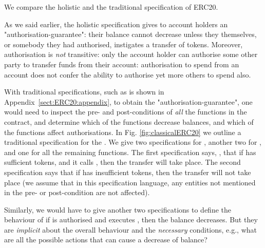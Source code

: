 We compare the holistic and the traditional specification of ERC20.

As we said earlier,  the holistic specification gives to account holders an
 "authorisation-guarantee": their balance cannot decrease unless they
 themselves, or somebody they had authorised, instigates a transfer of
 tokens. Moreover, authorisation is {\em not} transitive: only the
 account holder can authorise some other party to transfer funds from
 their account: authorisation to spend from an account does not confer
 the ability to authorise yet more others to spend also.
 
 With traditional  specifications, such as is shown in Appendix~\ref{sect:ERC20:appendix}, to obtain the "authorisation-guarantee", 
one would need to inspect the pre- and post-conditions of {\em all} the functions
in the contract, and determine which of the functions decrease balances, and which of the functions 
 affect authorisations.
In Fig. \ref{fig:classicalERC20} we outline a traditional specification for the .
We give two specifications for , another two for , and one for all 
the remaining functions. The  first specification says, \eg, that if  
  has sufficient tokens, and it calls , then the transfer will take place.  
The second specification says that  if  has insufficient tokens, then 
the transfer will not take place (we assume that in this
specification language, any entities not mentioned in the pre- or post-condition 
are not affected).
 
 Similarly, we would have to give another two specifications to define the behaviour of 
if  is authorised and executes , then   the balance decreases. 
But they are {\em implicit} about the overall behaviour and the   {\em necessary} conditions,
e.g., what are all the possible actions that can cause a decrease of balance?

